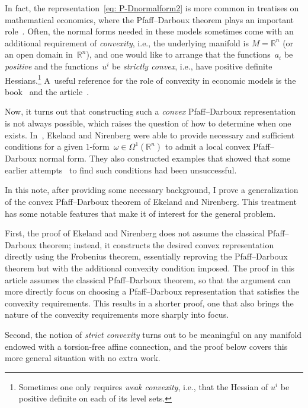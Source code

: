 \documentclass[10pt,a4paper]{amsart}
\newcommand{\bbR}{{\mathbb R}}
\numberwithin{equation}{section}
\begin{document}
In fact, the representation~\eqref{eq: P-Dnormalform2}
is more common in treatises on mathematical economics,
where the Pfaff--Darboux theorem plays an important role~\cite{MR1655519}.
Often, the normal forms needed in these models
sometimes come with an additional requirement of \emph{convexity},
i.e., the underlying manifold is $M=\bbR^n$
(or an open domain in~$\bbR^n$),
and one would like to arrange that the functions~$a_i$
be \emph{positive} and the functions~$u^i$ be \emph{strictly convex},
i.e., have positive definite Hessians.\footnote{Sometimes one only requires \emph{weak convexity},
i.e., that the Hessian of $u^i$ be positive definite
on each of its level sets.}
A~useful reference for the role of convexity
in economic models is the book~\cite{ChiapporiEkeland2009}
and the article~\cite{BrowningChiappori1998}.

Now, it turns out that constructing such a \emph{convex} Pfaff--Darboux
representation is not always possible,
which raises the question of how to determine when one exists.
In~\cite{MR2023129}, Ekeland and Nirenberg
were able to provide necessary and sufficient conditions
for a given $1$-form~$\omega\in\Omega^1(\bbR^n)$
to admit a local convex Pfaff--Darboux normal form.
They also constructed examples that showed
that some earlier attempts~\cite{MR1655519, MR1652709}
to find such conditions had been unsuccessful.

In this note, after providing some necessary background,
I prove a generalization of the convex Pfaff--Darboux theorem
of Ekeland and Nirenberg. This treatment has some
notable features that make it of interest for the general problem.

First, the proof of Ekeland and Nirenberg
does not assume the classical Pfaff--Darboux theorem;
instead, it constructs the desired convex representation directly
using the Frobenius theorem, essentially reproving the Pfaff--Darboux theorem
but with the additional convexity condition imposed.
The proof in this article assumes the classical
Pfaff--Darboux theorem, so that the argument can more directly focus
on choosing a Pfaff--Darboux representation
that satisfies the convexity requirements. This results in a shorter
proof, one that also brings the nature of the convexity requirements
more sharply into focus.

Second, the notion of \emph{strict convexity}
turns out to be meaningful on any manifold endowed with
a torsion-free affine connection, and the proof below
covers this more general situation with no extra work.
\end{document}

